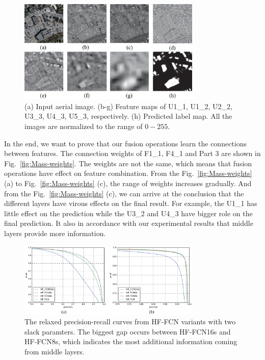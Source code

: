 \begin{figure}
\begin{center}
\includegraphics[width=8.7cm]{Figures/feature_maps.eps}
\caption{(a) Input aerial image. (b-g) Feature maps of U1\_1, U1\_2, U2\_2, U3\_3, U4\_3, U5\_3, respectively. (h) Predicted label map. All the images are normalized to the range of ${0-255}$.}
\label{fig:feature_maps}
\end{center}
\end{figure}


In the end, we want to prove that our fusion operations learn the connections between features. The connection weights of F1\_1, F4\_1 and Part 3 are shown in Fig.~\ref{fig:Mass-weights}. 
The weights are not the same, which means that fusion operations have effect on feature combination. 
From the Fig.~\ref{fig:Mass-weights} (a) to Fig.~\ref{fig:Mass-weights} (c), the range of weights increases gradually. And from the Fig.~\ref{fig:Mass-weights} (c), we can arrive at the conclusion that the different layers have virous effects on the final result. 
For example, the U1\_1 has little effect on the prediction while the U3\_2 and U4\_3 have bigger role on the final prediction. 
It also in accordance with our experimental results that middle layers provide more information.

\begin{figure}
\centering
\includegraphics[width=8.7cm]{Figures/HF-FCN-variant-PR.eps}
\caption{The relaxed precision-recall curves from HF-FCN variants with two slack paramters. The biggest gap occurs between HF-FCN16s and HF-FCN8s, which indicates the most additional information coming from middle layers.}
\label{fig:Mass-variants-PR}
\end{figure}

